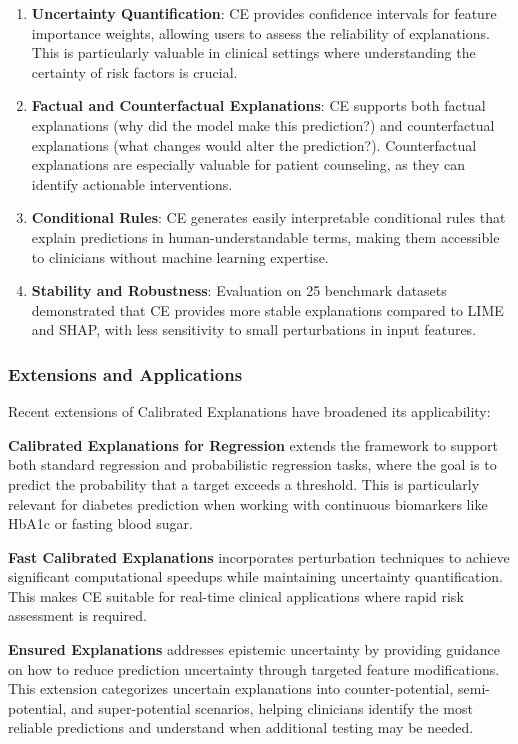 \begin{enumerate}
    \item \textbf{Uncertainty Quantification}: CE provides confidence intervals for feature importance weights, allowing users to assess the reliability of explanations. This is particularly valuable in clinical settings where understanding the certainty of risk factors is crucial.
    
    \item \textbf{Factual and Counterfactual Explanations}: CE supports both factual explanations (why did the model make this prediction?) and counterfactual explanations (what changes would alter the prediction?). Counterfactual explanations are especially valuable for patient counseling, as they can identify actionable interventions.
    
    \item \textbf{Conditional Rules}: CE generates easily interpretable conditional rules that explain predictions in human-understandable terms, making them accessible to clinicians without machine learning expertise.
    
    \item \textbf{Stability and Robustness}: Evaluation on 25 benchmark datasets demonstrated that CE provides more stable explanations compared to LIME and SHAP, with less sensitivity to small perturbations in input features.
\end{enumerate}

\subsubsection{Extensions and Applications}

Recent extensions of Calibrated Explanations have broadened its applicability:

\textbf{Calibrated Explanations for Regression} extends the framework to support both standard regression and probabilistic regression tasks, where the goal is to predict the probability that a target exceeds a threshold. This is particularly relevant for diabetes prediction when working with continuous biomarkers like HbA1c or fasting blood sugar.

\textbf{Fast Calibrated Explanations} incorporates perturbation techniques to achieve significant computational speedups while maintaining uncertainty quantification. This makes CE suitable for real-time clinical applications where rapid risk assessment is required.

\textbf{Ensured Explanations} addresses epistemic uncertainty by providing guidance on how to reduce prediction uncertainty through targeted feature modifications. This extension categorizes uncertain explanations into counter-potential, semi-potential, and super-potential scenarios, helping clinicians identify the most reliable predictions and understand when additional testing may be needed.

